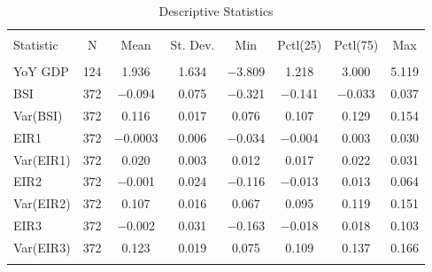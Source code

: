 \documentclass[12pt,a4paper,oneside]{book}
\begin{document}
\begin{table}[!htbp]  \centering \footnotesize 
  \caption{Descriptive Statistics} 
  \label{tab:descriptive statistics} 
\begin{tabular}{@{\extracolsep{5pt}}lccccccc} 
\\[-1.8ex]\hline 
\hline \\[-1.8ex] 
Statistic & \multicolumn{1}{c}{N} & \multicolumn{1}{c}{Mean} & \multicolumn{1}{c}{St. Dev.} & \multicolumn{1}{c}{Min} & \multicolumn{1}{c}{Pctl(25)} & \multicolumn{1}{c}{Pctl(75)} & \multicolumn{1}{c}{Max} \\ 
\hline \\[-1.8ex] 
YoY GDP     & 124       & 1.936 & 1.634 & $-$3.809 & 1.218 & 3.000 & 5.119 \\ 
BSI         & 372       & $-$0.094 & 0.075 & $-$0.321 & $-$0.141 & $-$0.033 & 0.037 \\ 
Var(BSI)    & 372       & 0.116 & 0.017 & 0.076 & 0.107 & 0.129 & 0.154 \\ 
EIR1        & 372       & $-$0.0003 & 0.006 & $-$0.034 & $-$0.004 & 0.003 & 0.030 \\ 
Var(EIR1)   & 372       & 0.020 & 0.003 & 0.012 & 0.017 & 0.022 & 0.031 \\ 
EIR2        & 372       & $-$0.001  & 0.024 & $-$0.116 & $-$0.013 & 0.013 & 0.064 \\ 
Var(EIR2)   & 372       & 0.107 & 0.016 & 0.067 & 0.095 & 0.119 & 0.151 \\ 
EIR3        & 372  & $-$0.002  & 0.031 & $-$0.163 & $-$0.018 & 0.018 & 0.103 \\ 
Var(EIR3)   & 372       & 0.123 & 0.019 & 0.075 & 0.109 & 0.137 & 0.166 \\ 
\hline \\[-1.8ex] 
\end{tabular} 
\end{table} 
\end{document}
